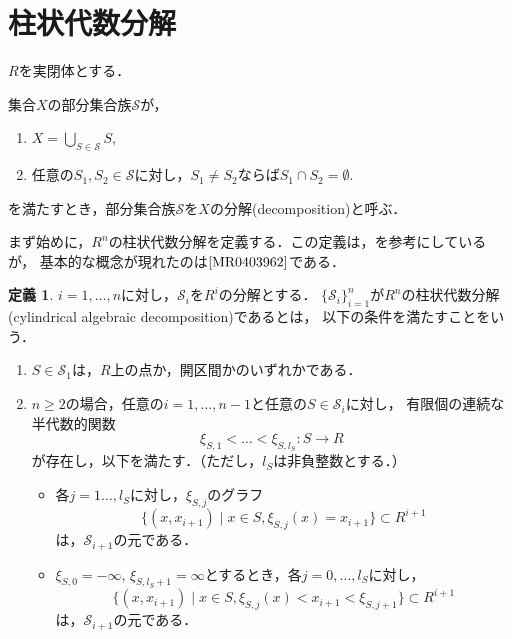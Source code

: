 \documentclass[uplatex, dvipdfmx]{jsarticle}
\numberwithin{equation}{section}
\newcommand{\calS}{\mathcal{S}}
\newcommand{\map}[3]{{#1}\colon{#2}\rightarrow{#3}}
\theoremstyle{definition}
\newtheorem{definition}{定義}[section]
\begin{document}
\section{柱状代数分解}

$R$を実閉体とする．

集合$X$の部分集合族$\calS$が，
\begin{enumerate}
     \item $X = \bigcup_{S \in \calS} S$,
     \item 任意の$S_1, S_2 \in \calS$に対し，$S_1 \neq S_2$ならば$S_1 \cap S_2 = \emptyset$.
\end{enumerate}
を満たすとき，部分集合族$\calS$を$X$の分解(decomposition)と呼ぶ．

まず始めに，$R^n$の柱状代数分解を定義する．この定義は，\cite{MR0764184}\cite[Definition 5.1]{MR2248869}を参考にしているが，
基本的な概念が現れたのは$\cite{MR0403962}$である．

\begin{definition} \label{definition:cad}
     $i=1, \dots, n$に対し，$\calS_i$を$R^i$の分解とする．
     $\{\calS_i\}_{i=1}^n$が$R^n$の柱状代数分解(cylindrical algebraic decomposition)であるとは，
     以下の条件を満たすことをいう．
     \begin{enumerate}
          \item $S \in \calS_1$は，$R$上の点か，開区間かのいずれかである．
          \item $n\geq 2$の場合，任意の$i=1, \dots, n-1$と任意の$S \in \calS_i$に対し，
          有限個の連続な半代数的関数
          \begin{equation}
               \map{\xi_{S,1}< \dots <\xi_{S,l_S}}{S}{R}
          \end{equation}
          が存在し，以下を満たす．（ただし，$l_S$は非負整数とする．）
          \begin{itemize}
               \item 各$j=1 \dots, l_S$に対し，$\xi_{S,j}$のグラフ
               \begin{equation}
                    \{(x,x_{i+1}) \mid x \in S, \xi_{S,j}(x)=x_{i+1} \} \subset R^{i+1}
               \end{equation}
               は，$\calS_{i+1}$の元である．
               \item $\xi_{S,0}=-\infty$, $\xi_{S,l_S+1}=\infty$とするとき，各$j=0, \dots, l_S$に対し，\label{cad_condition1}
               \begin{equation}
                    \{(x,x_{i+1}) \mid x \in S, \xi_{S,j}(x)<x_{i+1}<\xi_{S,j+1} \} \subset R^{i+1}
               \end{equation}
               は，$\calS_{i+1}$の元である．
          \end{itemize}
     \end{enumerate}
\end{definition}
\end{document}
